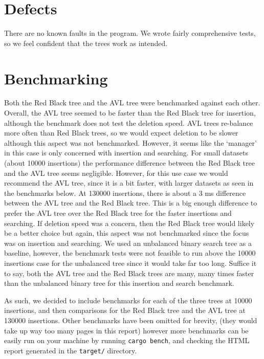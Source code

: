 \documentclass[letterpaper]{article}
\begin{document}
\section{Defects}

There are no known faults in the program.
We wrote fairly comprehensive tests, so we feel confident that the trees work as
intended.

\section{Benchmarking}
Both the Red Black tree and the AVL tree were benchmarked against each other.
Overall, the AVL tree seemed to be faster than the Red Black tree for insertion,
although the benchmark does not test the deletion speed. AVL trees re-balance
more often than Red Black trees, so we would expect deletion to be slower
although this aspect was not benchmarked.  However, it seems like the `manager'
in this case is only concerned with insertion and searching. For small datasets
(about 10000 insertions) the performance difference between the Red Black tree
and the AVL tree seems negligible. However, for this use case we would recommend
the AVL tree, since it is a bit faster, with larger datasets as seen in the
benchmarks below. At 130000 insertions, there is about a 3 ms difference between
the AVL tree and the Red Black tree. This is a big enough difference to prefer
the AVL tree over the Red Black tree for the faster insertions and searching.
If deletion speed was a concern, then the Red Black tree would
likely be a better choice but again, this aspect was not benchmarked since the
focus was on insertion and searching. We used an unbalanced binary search tree
as a baseline, however, the benchmark tests were not feasible to run above the
10000 insertions case for the unbalanced tree since it would take far too long.
Suffice it to say, both the AVL tree and the Red Black trees are many, many
times faster than the unbalanced binary tree for this insertion and search
benchmark.

As such, we decided to include benchmarks for each of the three trees at 10000
insertions, and then comparisons for the Red Black tree and the AVL tree at
130000 insertions. Other benchmarks have been omitted for brevity,
(they would take up way too many pages in this report)
however more benchmarks can be easily run on your machine by running
\verb|cargo bench|, and checking the HTML report generated in the
\texttt{target/} directory.
\end{document}
